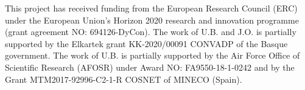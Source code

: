\documentclass[twocolumn]{autart}    %
\begin{document}
%
%
%
%
%


\begin{ack}            
This project has received funding from the European Research Council (ERC) under the European Union’s Horizon 2020 research and innovation programme (grant agreement NO: 694126-DyCon). The work of U.B. and J.O. is partially supported by the Elkartek grant KK-2020/00091 CONVADP of the Basque government. The work of U.B. is partially supported by the Air Force Office of Scientific Research (AFOSR) under Award NO: FA9550-18-1-0242 and by the Grant MTM2017-92996-C2-1-R COSNET of MINECO (Spain).
\end{ack}
 


 
\end{document}
